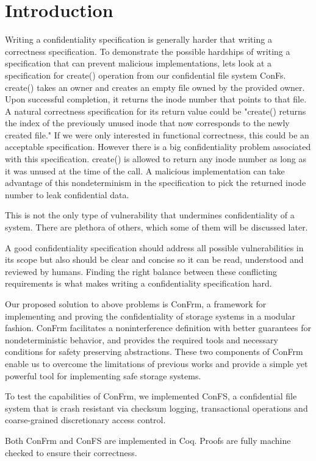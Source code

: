 
\section{Introduction}
Writing a confidentiality specification is generally harder that writing a correctness specification. To demonstrate the possible hardships of writing a specification that can prevent malicious implementations, lets look at a specification for create() operation from our confidential file system ConFs. create() takes an owner and creates an empty file owned by the provided owner. Upon successful completion, it returns the inode number that points to that file. A natural correctness specification for its return value could be "create() returns the index of the previously unused inode that now corresponds to the newly created file." If we were only interested in functional correctness, this could be an acceptable specification. However there is a big confidentiality problem  associated with this specification. create() is allowed to return any inode number as long as it was unused at the time of the call. A malicious implementation can take advantage of this nondeterminism in the specification to pick the returned inode number to leak confidential data.

This is not the only type of vulnerability that undermines confidentiality of a system. There are plethora of others, which some of them will be discussed later.

A good confidentiality specification should address all possible vulnerabilities in its scope but also should be clear and concise so it can be read, understood and reviewed by humans. Finding the right balance between these conflicting requirements is what makes writing a confidentiality specification hard.

Our proposed solution to above problems is ConFrm, a framework for implementing and proving the confidentiality of storage systems in a modular fashion. ConFrm facilitates a noninterference definition with better guarantees for nondeterministic behavior, and provides the required tools and necessary conditions for safety preserving abstractions. These two components of ConFrm enable us to overcome the limitations of previous works and provide a simple yet powerful tool for implementing safe storage systems. 

To test the capabilities of ConFrm, we implemented ConFS, a confidential file system that is crash resistant via checksum logging, transactional operations and coarse-grained discretionary access control. 

Both ConFrm and ConFS are implemented in Coq. Proofs are fully machine checked to ensure their correctness.

